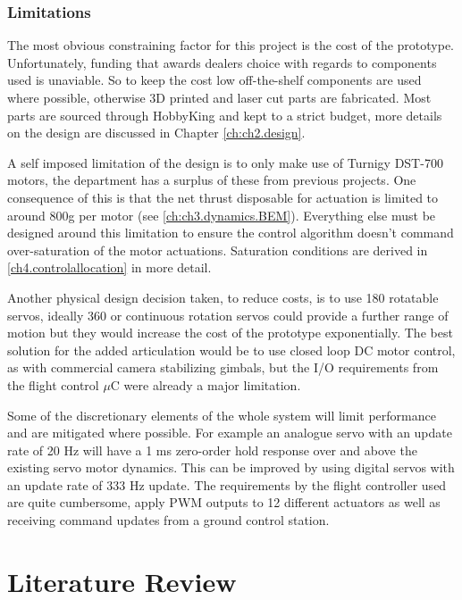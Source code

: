 \subsubsection{Limitations}
\label{subsubsec:ch1.foreward.limits}
The most obvious constraining factor for this project is the cost of the prototype. Unfortunately, funding that  awards dealers choice with regards to components used is unaviable. So to keep the cost low off-the-shelf components are used where possible, otherwise 3D printed and laser cut parts are fabricated. Most parts are sourced through HobbyKing \cite{hobbyking} and kept to a strict budget, more details on the design are discussed in Chapter \ref{ch:ch2.design}.
\par
A self imposed limitation of the design is to only make use of Turnigy DST-700 motors, the department has a surplus of these from previous projects. One consequence of this is that the net thrust disposable for actuation is limited to around 800g per motor (see \ref{ch:ch3.dynamics.BEM}). Everything else must be designed around this limitation to ensure the control algorithm doesn't command over-saturation of the motor actuations. Saturation conditions are derived in \ref{ch4.controlallocation} in more detail.
\par
Another physical design decision taken, to reduce costs, is to use 180 \textdegree rotatable servos, ideally 360 \textdegree or continuous rotation servos could provide a further range of motion but they would increase the cost of the prototype exponentially. The best solution for the added articulation would be to use closed loop DC motor control, as with commercial camera stabilizing gimbals, but the I/O requirements from the flight control $\mu$C were already a major limitation.
\par
Some of the discretionary elements of the whole system will limit performance and are mitigated where possible. For example an analogue servo with an update rate of 20 Hz will have a 1 ms zero-order hold response over and above the existing servo motor dynamics. This can be improved by using digital servos with an update rate of 333 Hz update. The requirements by the flight controller used are quite cumbersome, apply PWM outputs to 12 different actuators as well as receiving command updates from a ground control station. 
\section{Literature Review}
\label{sec:ch1.litreview}
